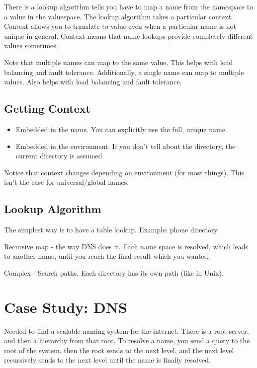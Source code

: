 \documentclass[psamsfonts]{amsart}
\begin{document}
There is a lookup algorithm tells you have to map a name from the namespace to a value in the valuespace. The lookup algorithm takes a particular context. Context allows you to translate to value even when a particular name is not unique in general. Context means that name lookups provide completely different values sometimes.

Note that multiple names can map to the same value. This helps with load balancing and fault tolerance. Additionally, a single name can map to multiple values. Also helps with load balancing and fault tolerance.

\subsection{Getting Context}

\begin{itemize}
\item Embedded in the name. You can explicitly use the full, unique name.
\item Embedded in the environment. If you don't tell about the directory, the current directory is assumed.
\end{itemize}

Notice that context changes depending on environment (for most things). This isn't the case for universal/global names.

\subsection{Lookup Algorithm}

The simplest way is to have a table lookup. Example: phone directory. 

Recursive map - the way DNS does it. Each name space is resolved, which leads to another name, until you reach the final result which you wanted. 

Complex - Search paths. Each directory has its own path (like in Unix). 

\section{Case Study: DNS}

Needed to find a scalable naming system for the internet. There is a root server, and then a hierarchy from that root. To resolve a name, you send a query to the root of the system, then the root sends to the next level, and the next level recursively sends to the next level until the name is finally resolved.
\end{document}
